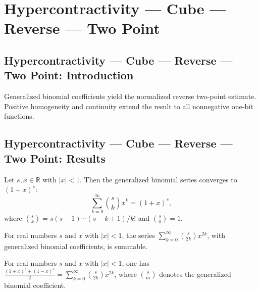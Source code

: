 \section{Hypercontractivity --- Cube --- Reverse --- Two Point}
\subsection*{Hypercontractivity --- Cube --- Reverse --- Two Point: Introduction}
Generalized binomial coefficients yield the normalized reverse two-point estimate. Positive homogeneity and continuity extend the result to all nonnegative one-bit functions.

\subsection*{Hypercontractivity --- Cube --- Reverse --- Two Point: Results}

\begin{lemma}
\leanok
{}
Let $s,x\in\mathbb R$ with $|x|<1$. Then the generalized binomial series converges to
$(1+x)^s$:
\[\sum_{k=0}^{\infty}\binom{s}{k}x^k=(1+x)^s,\]
where $\binom{s}{k}=s(s-1)\cdots(s-k+1)/k!$ and $\binom{s}{0}=1$.
\end{lemma}

\begin{lemma}
\leanok
{}
For real numbers $s$ and $x$ with $|x|<1$, the series
$\sum_{k=0}^{\infty}\binom{s}{2k}x^{2k}$, with generalized binomial coefficients, is
summable.
\end{lemma}

\begin{lemma}
\leanok
{}
For real numbers $s$ and $x$ with $|x|<1$, one has
$\frac{(1+x)^s+(1-x)^s}{2}=\sum_{k=0}^{\infty}\binom{s}{2k}x^{2k}$, where $\binom{s}{m}$
denotes the generalized binomial coefficient.
\end{lemma}

